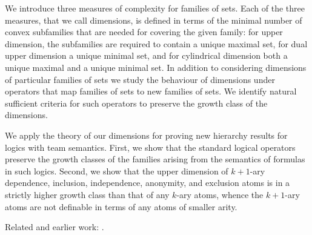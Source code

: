 \documentclass[bsl,meeting]{asl}
\newcommand{\NP}{}
\begin{document}
\thispagestyle{empty}


\NP  
{}

We introduce three measures of complexity for families of sets. 
Each of the three measures, that we call dimensions, is defined in terms of the minimal number of 
convex subfamilies that are needed for covering the given family: 
for upper dimension, the subfamilies are required to contain a unique 
maximal set, for dual upper dimension a unique minimal set, and for cylindrical 
dimension both a unique maximal and a unique minimal set. In addition to considering dimensions of 
particular families of sets we study the behaviour of dimensions under operators that map families
of sets to new families of sets. We identify natural sufficient criteria for such operators to preserve the
growth class of the dimensions. 

We apply the theory of our dimensions for proving new hierarchy results for logics with 
team semantics. First, we show that the standard logical operators preserve the growth classes
of the families arising from the semantics of formulas in such logics. Second, we show that the upper
dimension of $k+1$-ary dependence, inclusion, independence, anonymity, and exclusion atoms is in a strictly
higher growth class than that of any $k$-ary atoms, whence the $k+1$-ary atoms are not definable 
in terms of any atoms of smaller arity.

Related and earlier work: \cite{ciardelli09}\cite{HLSV}\cite{HS}\cite{LVil}.

%
%
\end{document}
